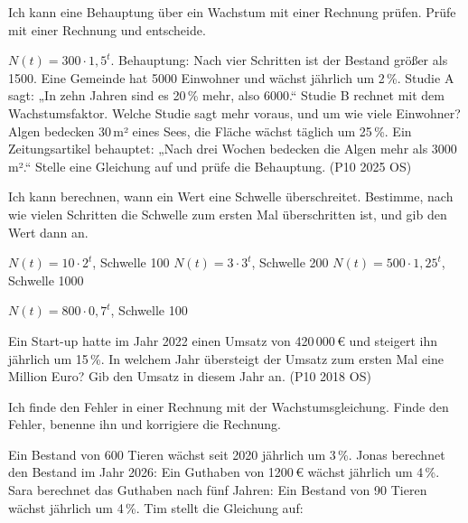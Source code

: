 \begin{aufgabe}{Ich kann eine Behauptung über ein Wachstum mit einer Rechnung prüfen.}
Prüfe mit einer Rechnung und entscheide.
\begin{teile}
\teil $N(t) = 300 \cdot 1{,}5^t$. Behauptung: Nach vier Schritten ist der Bestand größer als 1500.
\teil Eine Gemeinde hat 5000 Einwohner und wächst jährlich um 2\,\%. Studie A sagt: „In zehn Jahren sind es 20\,\% mehr, also 6000.“ Studie B rechnet mit dem Wachstumsfaktor. Welche Studie sagt mehr voraus, und um wie viele Einwohner?
\teil Algen bedecken 30\,m² eines Sees, die Fläche wächst täglich um 25\,\%. Ein Zeitungsartikel behauptet: „Nach drei Wochen bedecken die Algen mehr als 3000\,m².“ Stelle eine Gleichung auf und prüfe die Behauptung. (P10 2025 OS)
\end{teile}
\end{aufgabe}

\begin{aufgabe}{Ich kann berechnen, wann ein Wert eine Schwelle überschreitet.}
Bestimme, nach wie vielen Schritten die Schwelle zum ersten Mal überschritten ist, und gib den Wert dann an.
\begin{teile}
\teil $N(t) = 10 \cdot 2^t$, Schwelle 100 \quad {} 
\teil $N(t) = 3 \cdot 3^t$, Schwelle 200 \quad {} 
\teil $N(t) = 500 \cdot 1{,}25^t$, Schwelle 1000 \quad {} 
\end{teile}
\begin{teile}
\teil $N(t) = 800 \cdot 0{,}7^t$, Schwelle 100 \quad {} 
\end{teile}
\begin{teile}
\teil Ein Start-up hatte im Jahr 2022 einen Umsatz von 420\,000\,€ und steigert ihn jährlich um 15\,\%. In welchem Jahr übersteigt der Umsatz zum ersten Mal eine Million Euro? Gib den Umsatz in diesem Jahr an. (P10 2018 OS)
\end{teile}
\end{aufgabe}

\clearpage
\begin{aufgabe}{Ich finde den Fehler in einer Rechnung mit der Wachstumsgleichung.}
Finde den Fehler, benenne ihn und korrigiere die Rechnung.
\begin{teile}
\teil Ein Bestand von 600 Tieren wächst seit 2020 jährlich um 3\,\%. Jonas berechnet den Bestand im Jahr 2026:
\teil Ein Guthaben von 1200\,€ wächst jährlich um 4\,\%. Sara berechnet das Guthaben nach fünf Jahren:
\teil Ein Bestand von 90 Tieren wächst jährlich um 4\,\%. Tim stellt die Gleichung auf:
\end{teile}
\end{aufgabe}

